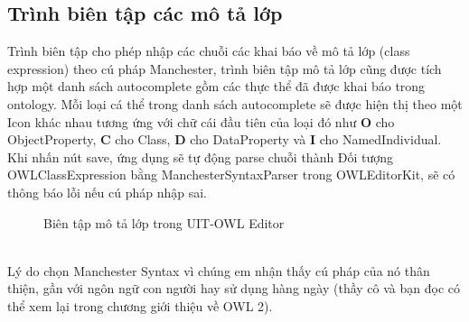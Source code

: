 \subsection{Trình biên tập các mô tả lớp}
Trình biên tập cho phép nhập các chuỗi các khai báo về mô tả lớp (class expression) theo cú pháp Manchester, trình biên tập mô tả lớp cũng được tích hợp một danh sách autocomplete gồm các thực thể đã được khai báo trong ontology. Mỗi loại cá thể trong danh sách autocomplete sẽ được hiện thị theo một Icon khác nhau tương ứng với chữ cái đầu tiên của loại đó như \textbf{O} cho ObjectProperty, \textbf{C} cho Class, \textbf{D} cho DataProperty và \textbf{I} cho NamedIndividual. Khi nhấn nút save, ứng dụng sẽ tự động parse chuỗi thành Đối tượng OWLClassExpression bằng ManchesterSyntaxParser trong OWLEditorKit, sẽ có thông báo lỗi nếu cú pháp nhập sai.
\begin{figure}[h!]
	\centering
	\caption{Biên tập mô tả lớp trong UIT-OWL Editor\label{overflow}}
\end{figure}
\\
Lý do chọn Manchester Syntax vì chúng em nhận thấy cú pháp của nó thân thiện, gần với ngôn ngữ con người hay sử dụng hàng ngày (thầy cô và bạn đọc có thể xem lại trong chương giới thiệu về OWL 2).
